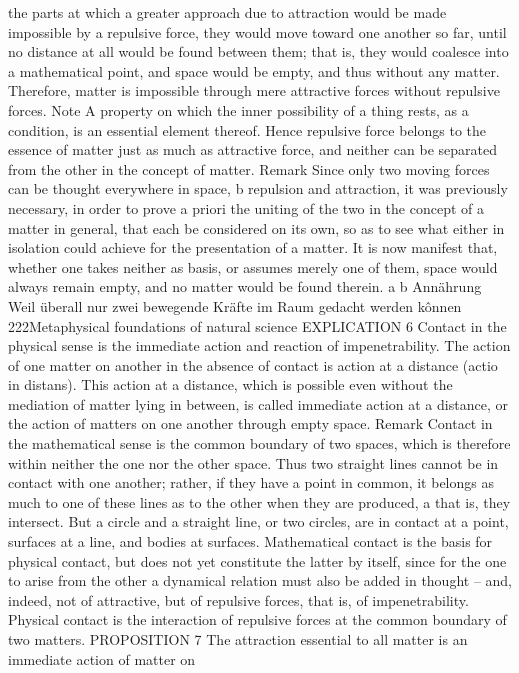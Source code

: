the parts at which a greater approach due to attraction would be made
impossible by a repulsive force, they would move toward one another so
far, until no distance at all would be found between them; that is, they
would coalesce into a mathematical point, and space would be empty,
and thus without any matter. Therefore, matter is impossible through
mere attractive forces without repulsive forces.
Note
A property on which the inner possibility of a thing rests, as a condition,
is an essential element thereof. Hence repulsive force belongs to the
essence of matter just as much as attractive force, and neither can be
separated from the other in the concept of matter.
Remark
Since only two moving forces can be thought everywhere in space, b
repulsion and attraction, it was previously necessary, in order to prove a
priori the uniting of the two in the concept of a matter in general, that
each be considered on its own, so as to see what either in isolation could
achieve for the presentation of a matter. It is now manifest that, whether
one takes neither as basis, or assumes merely one of them, space would
always remain empty, and no matter would be found therein.
a
b
Annährung
Weil überall nur zwei bewegende Kräfte im Raum gedacht werden kônnen
222Metaphysical foundations of natural science
EXPLICATION 6
Contact in the physical sense is the immediate action and reaction of
impenetrability. The action of one matter on another in the absence of
contact is action at a distance (actio in distans). This action at a distance,
which is possible even without the mediation of matter lying in between,
is called immediate action at a distance, or the action of matters on one
another through empty space.
Remark
Contact in the mathematical sense is the common boundary of two
spaces, which is therefore within neither the one nor the other space.
Thus two straight lines cannot be in contact with one another; rather, if
they have a point in common, it belongs as much to one of these lines
as to the other when they are produced, a that is, they intersect. But a
circle and a straight line, or two circles, are in contact at a point, surfaces
at a line, and bodies at surfaces. Mathematical contact is the basis for
physical contact, but does not yet constitute the latter by itself, since for
the one to arise from the other a dynamical relation must also be added
in thought – and, indeed, not of attractive, but of repulsive forces, that is,
of impenetrability. Physical contact is the interaction of repulsive forces
at the common boundary of two matters.
PROPOSITION 7
The attraction essential to all matter is an immediate action of matter on

